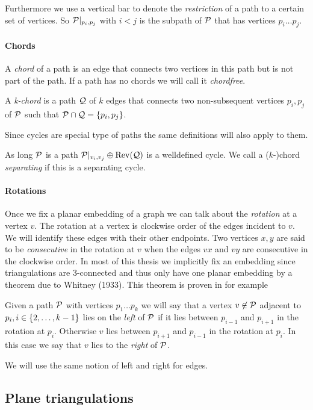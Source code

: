   Furthermore we use a vertical bar to denote the \emph{restriction} of a path to a certain set of vertices. So $\P|_{p_i, p_j}$ with $i<j$ is the subpath of $\P$ that has vertices $p_i \ldots p_j$.

\paragraph{Chords}
 A \emph{chord} of a path is an edge that connects two vertices in this path but is not part of the path. If a path has no chords we will call it \emph{chordfree}.

  A \emph{k-chord} is a path $\Q$ of $k$ edges that connects two non-subsequent vertices $p_i, p_j$ of $\P$ such that $\P \cap \Q = \braces{p_i, p_j}$.

  Since cycles are special type of paths the same definitions will also apply to them.

  As long $\P$ is a path $\P|_{v_i, v_j} \oplus \rev(\Q)$ is a welldefined cycle. We call a ($k$-)chord \emph{separating} if this is a separating cycle.

\paragraph{Rotations}
  Once we fix a planar embedding of a graph we can talk about the \emph{rotation} at a vertex $v$. The rotation at a vertex is clockwise order of the edges incident to $v$. We will identify these edges with their other endpoints. Two vertices $x, y$ are said to be \emph{consecutive} in the rotation at $v$ when the edges $vx$ and $vy$ are consecutive in the clockwise order. In most of this thesis we implicitly fix an embedding since triangulations are 3-connected and thus only have one planar embedding by a theorem due to Whitney (1933). This theorem is proven in for example \cite[p. 267]{Bondy2008}

  Given a path $\P$ with vertices $p_1 \ldots p_k$ we will say that a vertex $v \nin \P$ adjacent to $p_i, i \in \braces{2, \ldots, k-1}$ lies on the \emph{left} of $\P$ if it lies between $p_{i-1}$ and $p_{i+1}$ in the rotation at $p_{i}$. Otherwise $v$ lies between $p_{i+1}$ and $p_{i-1}$ in the
  rotation at $p_i$. In this case we say that $v$ lies to the \emph{right} of $\P$.

  We will use the same notion of left and right for edges.

\subsection{Plane triangulations}


